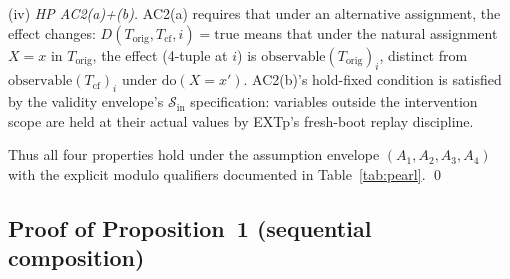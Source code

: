 \documentclass[conference]{IEEEtran}
\newcommand{\Korig}{T_\text{orig}}
\newcommand{\Tcf}{T_\text{cf}}
\newcommand{\dox}[1]{\text{do}(X{=}#1)}
\begin{document}
(iv) \emph{HP AC2(a)+(b).} AC2(a) requires that under an
alternative assignment, the effect changes:
$D(\Korig, \Tcf, i) = \text{true}$ means that under the natural
assignment $X = x$ in $\Korig$, the effect (4-tuple at $i$) is
$\text{observable}(\Korig)_i$, distinct from
$\text{observable}(\Tcf)_i$ under $\dox{x'}$. AC2(b)'s hold-fixed
condition is satisfied by the validity envelope's
$\mathcal{S}_\text{in}$ specification: variables outside the
intervention scope are held at their actual values by EXTp's
fresh-boot replay discipline.

Thus all four properties hold under the assumption envelope
$(A_1, A_2, A_3, A_4)$ with the explicit modulo qualifiers
documented in Table~\ref{tab:pearl}. \qed

\subsection{Proof of Proposition~1 (sequential composition)}
\end{document}
